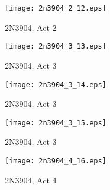 	\begin{framed}
	
	\end{framed}


	\begin{figure}[hb!]
		\centering
		\texttt{[image: 2n3904\_2\_12.eps]}
		\caption{2N3904, Act 2}
		\label{fig:n4}
	\end{figure}

	\begin{framed}
	
	\end{framed}

	\begin{figure}[hb!]
		\centering
		\texttt{[image: 2n3904\_3\_13.eps]}
		\caption{2N3904, Act 3}
		\label{fig:n5}
	\end{figure}

	\begin{framed}
	
	\end{framed}
	
	\begin{figure}[hb!]
		\centering
		\texttt{[image: 2n3904\_3\_14.eps]}
		\caption{2N3904, Act 3}
		\label{fig:n6}
	\end{figure}

	\begin{framed}
	
	\end{framed}

	\begin{figure}[hb!]
		\centering
		\texttt{[image: 2n3904\_3\_15.eps]}
		\caption{2N3904, Act 3}
		\label{fig:n7}
	\end{figure}

	\begin{framed}
	
	\end{framed}

	\begin{figure}[hb!]
		\centering
		\texttt{[image: 2n3904\_4\_16.eps]}
		\caption{2N3904, Act 4}
		\label{fig:n8}
	\end{figure}

	\begin{framed}
	
	\end{framed}
